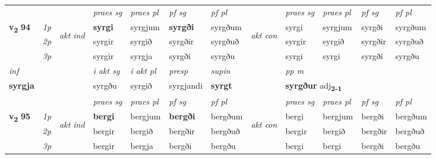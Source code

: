 \begin{longtable}[l]{X>{\footnotesize\itshape}llXXXXlXXXX}
\midrule

 & &   & \textit{praes sg}  & \textit{praes pl}    & \textit{ pf sg} & \textit{pf pl} & & \textit{praes sg}  & \textit{praes pl}    & \textit{pf sg} & \textit{pf pl }  \\ \cmidrule{4-7} \cmidrule{9-12}
 \multirow{2}{*}{{{\textbf{v{\textsubscript{2}}} \Large{\textbf{94}}}}}  & 1p & \multirow{3}{*}{\begin{turn}{90}\textit{akt ind}\end{turn}} & \textbf{syrgi} & syrgjum & \textbf{syrgði} & syrgðum & \multirow{3}{*}{\begin{turn}{90}\textit{akt con}\end{turn}} &syrgi & syrgjum & syrgði & syrgðum\\*
 & 2p &  &  syrgir  & syrgið & syrgðir & syrgðuð & & syrgir & syrgið & syrgðir & syrgðuð \\*
 & 3p &  & syrgir & syrgja & syrgði & syrgðu & & syrgi & syrgi& syrgði & syrgðu \\*
\cmidrule{4-7} \cmidrule{9-12}

   {\textit{inf}} & &  & \textit{i akt sg} & \textit{i akt pl}   & \textit{presp} & \textit{supin}  && \textit{pp m} \\*
  {\textbf{syrgja}} & && syrgðu  & syrgið   & syrgjandi &  \textbf{syrgt}  && \multicolumn{2}{l}{\textbf{syrgður} adj\textbf{\textsubscript{2-1}}} \\*

\midrule

 & &   & \textit{praes sg}  & \textit{praes pl}    & \textit{ pf sg} & \textit{pf pl} & & \textit{praes sg}  & \textit{praes pl}    & \textit{pf sg} & \textit{pf pl }  \\ \cmidrule{4-7} \cmidrule{9-12}
 \multirow{2}{*}{{{\textbf{v{\textsubscript{2}}} \Large{\textbf{95}}}}}  & 1p & \multirow{3}{*}{\begin{turn}{90}\textit{akt ind}\end{turn}} & \textbf{bergi} & bergjum & \textbf{bergði} & bergðum & \multirow{3}{*}{\begin{turn}{90}\textit{akt con}\end{turn}} &bergi & bergjum & bergði & bergðum\\*
 & 2p &  &  bergir  & bergið & bergðir & bergðuð & & bergir & bergið & bergðir & bergðuð \\*
 & 3p &  & bergir & bergja & bergði & bergðu & & bergi & bergi& bergði & bergðu \\*
\cmidrule{4-7} \cmidrule{9-12}


\end{longtable}
